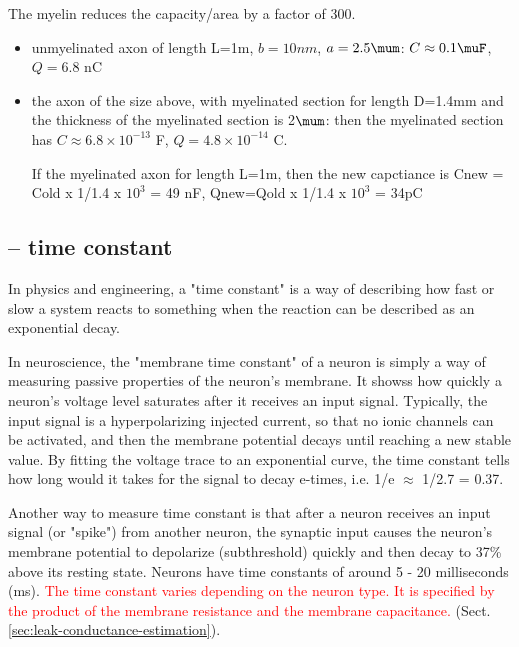 The myelin reduces the capacity/area by a factor of 300.
\begin{itemize}
  \item unmyelinated axon of length L=1m, $b=10nm$, $a=2.5\mum$: $C \approx 0.1
  \muF$, $Q = 6.8$ nC
  \item the axon of the size above, with myelinated section for length D=1.4mm
  and the thickness of the myelinated section is 2$\mum$: then the myelinated
  section has $C \approx 6.8 \times 10^{-13}$ F, $Q=4.8\times 10^{-14}$ C.
  
  If the myelinated axon for length L=1m, then the new capctiance is Cnew = Cold
  x 1/1.4 x $10^3$ = 49 nF, Qnew=Qold x 1/1.4 x $10^3$ = 34pC
\end{itemize}



\subsection{-- time constant}
\label{sec:membrane-time-constant}

In physics and engineering, a "time constant" is a way of describing how fast or
slow a system reacts to something when the reaction can be described as an
exponential decay.

In neuroscience, the "membrane time constant" of a neuron is simply a way of
measuring passive properties of the neuron's membrane. It showss how quickly a
neuron's voltage level saturates after it receives
an input signal. Typically, the input signal is a hyperpolarizing injected
current, so that no ionic channels can be activated, and then the membrane
potential decays until reaching a new stable value. By fitting the voltage trace
to an exponential curve, the time constant tells how long would it takes for
the signal to decay e-times, i.e.
1/e $\approx$ 1/2.7 = 0.37.

Another way to measure time constant is that after a neuron receives an input
signal (or "spike") from another neuron, the synaptic input causes the neuron's
membrane potential to depolarize (subthreshold) quickly and then decay to 37\%
above its resting state. Neurons have time constants of around 5 - 20
milliseconds (ms).
\textcolor{red}{The time constant varies depending on the neuron type. It is
specified by the product of the membrane resistance and the membrane
capacitance.} (Sect.\ref{sec:leak-conductance-estimation}).

%   

